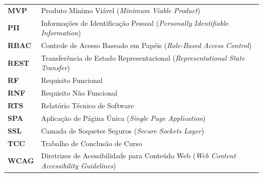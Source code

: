 {\begin{tabular}{@{}p{2.0cm}p{13.5cm}@{}}
    \textbf{MVP}       & Produto Mínimo Viável (\textit{Minimum Viable Product}) \\
    \textbf{PII}       & Informações de Identificação Pessoal (\textit{Personally Identifiable Information}) \\
    \textbf{RBAC}      & Controle de Acesso Baseado em Papéis (\textit{Role-Based Access Control}) \\
    \textbf{REST}      & Transferência de Estado Representacional (\textit{Representational State Transfer}) \\
    \textbf{RF}        & Requisito Funcional \\
    \textbf{RNF}       & Requisito Não Funcional \\
    \textbf{RTS}       & Relatório Técnico de Software \\
    \textbf{SPA}       & Aplicação de Página Única (\textit{Single Page Application}) \\
    \textbf{SSL}       & Camada de Soquetes Seguros (\textit{Secure Sockets Layer}) \\
    \textbf{TCC}       & Trabalho de Conclusão de Curso \\
    \textbf{WCAG}      & Diretrizes de Acessibilidade para Conteúdo Web (\textit{Web Content Accessibility Guidelines}) \\
\end{tabular}}